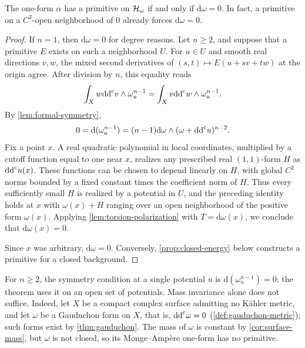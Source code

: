 \begin{theorem}\label{thm:raw-primitive}
The one-form $\alpha$ has a primitive on $\mathcal H_\omega$ if and only if $\mathrm{d}\omega=0$. In fact, a primitive on a $C^2$-open neighborhood of $0$ already forces $\mathrm{d}\omega=0$.
\end{theorem}
\begin{proof}
If $n=1$, then $\mathrm d\omega=0$ for degree reasons. Let $n\geq2$, and suppose that a primitive $E$ exists on such a neighborhood $U$. For $u\in U$ and smooth real directions $v,w$, the mixed second derivatives of $(s,t)\mapsto E(u+sv+tw)$ at the origin agree. After division by $n$, this equality reads
\begin{equation}\label{eq:energy-symmetry}
 \int_Xw\mathrm{dd}^{\mathrm{c}} v\wedge\omega_u^{n-1}
 =\int_Xv\mathrm{dd}^{\mathrm{c}} w\wedge\omega_u^{n-1}.
\end{equation}
By \cref{lem:formal-symmetry},
\[
 0=\mathrm{d}(\omega_u^{n-1})
 =(n-1)\mathrm{d}\omega\wedge(\omega+\mathrm{dd}^{\mathrm{c}} u)^{n-2}.
\]
Fix a point $x$. A real quadratic polynomial in local coordinates, multiplied by a cutoff function equal to one near $x$, realizes any prescribed real $(1,1)$-form $H$ as $\mathrm{dd}^{\mathrm{c}} u(x)$. These functions can be chosen to depend linearly on $H$, with global $C^2$ norms bounded by a fixed constant times the coefficient norm of $H$. Thus every sufficiently small $H$ is realized by a potential in $U$, and the preceding identity holds at $x$ with $\omega(x)+H$ ranging over an open neighborhood of the positive form $\omega(x)$. Applying \cref{lem:torsion-polarization} with $T=\mathrm{d}\omega(x)$, we conclude that $\mathrm{d}\omega(x)=0$.

Since $x$ was arbitrary, $\mathrm{d}\omega=0$. Conversely, \cref{prop:closed-energy} below constructs a primitive for a closed background.
\end{proof}

For $n\geq2$, the symmetry condition at a single potential $u$ is $\mathrm d(\omega_u^{n-1})=0$; the theorem uses it on an open set of potentials. Mass invariance alone does not suffice. Indeed, let $X$ be a compact complex surface admitting no K\"ahler metric, and let $\omega$ be a Gauduchon form on $X$, that is, $\mathrm{dd}^{\mathrm{c}}\omega=0$ (\cref{def:gauduchon-metric}); such forms exist by \cref{thm:gauduchon}. The mass of $\omega$ is constant by \cref{cor:surface-mass}, but $\omega$ is not closed, so its Monge--Amp\`ere one-form has no primitive.

